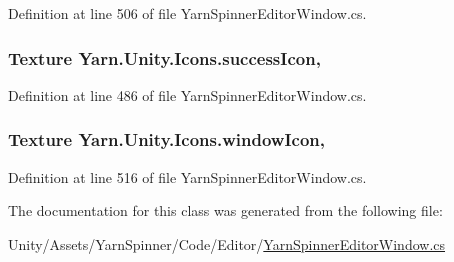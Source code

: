 Definition at line 506 of file Yarn\-Spinner\-Editor\-Window.\-cs.

\hypertarget{a00106_aec8aea03eb6e31771ebc98e0611fff79}{
\subsubsection[{success\-Icon}]{\setlength{\rightskip}{0pt plus 5cm}Texture Yarn.\-Unity.\-Icons.\-success\-Icon\hspace{0.3cm}{\ttfamily [static]}, {\ttfamily [get]}}}\label{a00106_aec8aea03eb6e31771ebc98e0611fff79}


Definition at line 486 of file Yarn\-Spinner\-Editor\-Window.\-cs.

\hypertarget{a00106_aa78ab016ad041bc36850c8b20ba63972}{
\subsubsection[{window\-Icon}]{\setlength{\rightskip}{0pt plus 5cm}Texture Yarn.\-Unity.\-Icons.\-window\-Icon\hspace{0.3cm}{\ttfamily [static]}, {\ttfamily [get]}}}\label{a00106_aa78ab016ad041bc36850c8b20ba63972}


Definition at line 516 of file Yarn\-Spinner\-Editor\-Window.\-cs.



The documentation for this class was generated from the following file\-:\begin{DoxyCompactItemize}
\item 
Unity/\-Assets/\-Yarn\-Spinner/\-Code/\-Editor/\hyperlink{a00270}{Yarn\-Spinner\-Editor\-Window.\-cs}\end{DoxyCompactItemize}
